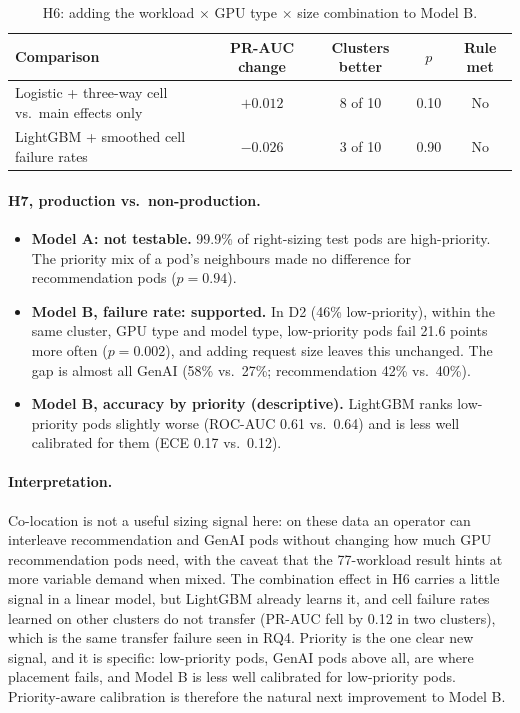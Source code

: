 \begin{table}[H]
\centering\small
\caption{H6: adding the workload $\times$ GPU type $\times$ size combination to Model B.}
\label{tab:h6}
\begin{tabular}{@{}lcccc@{}}
\toprule
Comparison & PR-AUC change & Clusters better & $p$ & Rule met \\
\midrule
Logistic + three-way cell vs.\ main effects only & $+0.012$ & 8 of 10 & 0.10 & No \\
LightGBM + smoothed cell failure rates & $-0.026$ & 3 of 10 & 0.90 & No \\
\bottomrule
\end{tabular}
\end{table}

\paragraph{H7, production vs.\ non-production.}
\begin{itemize}
  \item \textbf{Model A: not testable.} 99.9\% of right-sizing test pods are high-priority. The priority mix of a pod's neighbours made no difference for recommendation pods ($p = 0.94$).
  \item \textbf{Model B, failure rate: supported.} In D2 (46\% low-priority), within the same cluster, GPU type and model type, low-priority pods fail 21.6 points more often ($p = 0.002$), and adding request size leaves this unchanged. The gap is almost all GenAI (58\% vs.\ 27\%; recommendation 42\% vs.\ 40\%).
  \item \textbf{Model B, accuracy by priority (descriptive).} LightGBM ranks low-priority pods slightly worse (ROC-AUC 0.61 vs.\ 0.64) and is less well calibrated for them (ECE 0.17 vs.\ 0.12).
\end{itemize}

\paragraph{Interpretation.} Co-location is not a useful sizing signal here: on these data an operator can interleave recommendation and GenAI pods without changing how much GPU recommendation pods need, with the caveat that the 77-workload result hints at more variable demand when mixed. The combination effect in H6 carries a little signal in a linear model, but LightGBM already learns it, and cell failure rates learned on other clusters do not transfer (PR-AUC fell by 0.12 in two clusters), which is the same transfer failure seen in RQ4. Priority is the one clear new signal, and it is specific: low-priority pods, GenAI pods above all, are where placement fails, and Model B is less well calibrated for low-priority pods. Priority-aware calibration is therefore the natural next improvement to Model B.
